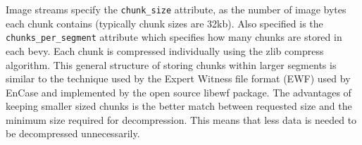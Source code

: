 \documentclass[10pt, conference]{IEEEtran}
\begin{document}
Image streams specify the \texttt{chunk\_size} attribute, as the
number of image bytes each chunk contains (typically chunk sizes are
32kb). Also specified is the \texttt{chunks\_per\_segment} attribute
which specifies how many chunks are stored in each bevy. Each chunk is
compressed individually using the zlib compress algorithm. This
general structure of storing chunks within larger segments is similar
to the technique used by the Expert Witness file format (EWF) used by
EnCase\cite{encase-3.0} and implemented by the open source
libewf\cite{libewf} package. The advantages of keeping smaller sized
chunks is the better match between requested size and the minimum size
required for decompression. This means that less data is needed to be
decompressed unnecessarily.





\end{document}
